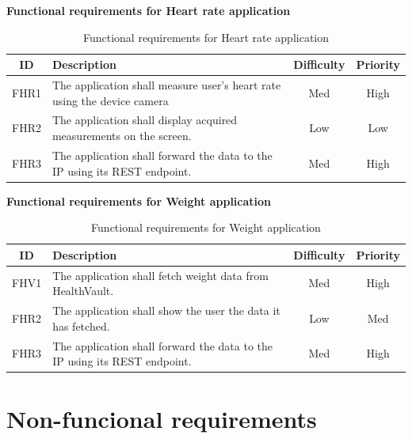 \textbf{Functional requirements for Heart rate application}

\begin{table}[h]
\begin{center}
\begin{tabular}{ | c | p{9cm} | c | c |}
  \hline
  ID & Description & Difficulty & Priority\\
  \hline\noalign{\smallskip}\noalign{\smallskip}\hline
  FHR1	& The application shall measure user’s heart rate using the device camera	& Med	& High \\
  FHR2	& The application shall display acquired measurements on the screen.		& Low	& Low \\
  FHR3	& The application shall forward the data to the IP using its REST endpoint. & Med	& High \\
  \hline
\end{tabular}
\end{center}
\caption{Functional requirements for Heart rate application}
\label{table:reqfrontend}
\end{table}

\textbf{Functional requirements for Weight application}

\begin{table}[h]
\begin{center}
\begin{tabular}{ | c | p{9cm} | c | c |}
  \hline
  ID & Description & Difficulty & Priority\\
  \hline\noalign{\smallskip}\noalign{\smallskip}\hline
  FHV1	& The application shall fetch weight data from HealthVault.						      & Med	& High \\
  FHR2	& The application shall show the user the data it has fetched.              & Low	& Med \\
  FHR3	& The application shall forward the data to the IP using its REST endpoint. & Med	& High \\
  \hline
\end{tabular}
\end{center}
\caption{Functional requirements for Weight application}
\label{table:reqfrontend}
\end{table}


\section{Non-funcional requirements}
\label{section:nonfunctionalreq}

